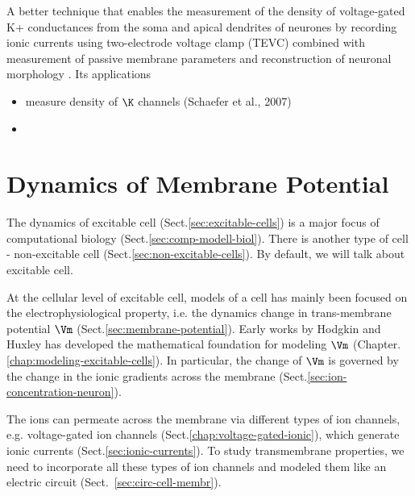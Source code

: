 A better technique that enables the measurement of the density of voltage-gated
K+ conductances from the soma and apical dendrites of neurones by recording
ionic currents using two-electrode voltage clamp (TEVC) combined with
measurement of passive membrane parameters and reconstruction of neuronal
morphology \citep{schaefer2003}. Its applications
\begin{itemize}
  \item measure density of $\K$ channels (Schaefer et al., 2007)

  \item
\end{itemize}

\chapter{Dynamics of Membrane Potential}
\label{chap:dynamics-Vm}

\def\Erev{{\text{E}_{\text{rev}}}}
  \def\deact{{\text{deact}}}

The dynamics of excitable cell (Sect.\ref{sec:excitable-cells}) is a major focus
of computational biology (Sect.\ref{sec:comp-modell-biol}).
There is another type of cell - non-excitable cell
(Sect.\ref{sec:non-excitable-cells}).
By default, we will talk about excitable cell.

At the cellular level of excitable cell, models of a cell has mainly been
focused on the electrophysiological property, i.e. the dynamics change in
trans-membrane potential $\Vm$ (Sect.\ref{sec:membrane-potential}).
Early works by Hodgkin and Huxley has developed the mathematical foundation for
modeling $\Vm$ (Chapter.\ref{chap:modeling-excitable-cells}). In particular, the
change of $\Vm$ is governed by the change in the ionic gradients across the
membrane (Sect.\ref{sec:ion-concentration-neuron}).

The ions can permeate across the membrane via different types of ion channels,
e.g. voltage-gated ion channels (Sect.\ref{chap:voltage-gated-ionic}), which
generate ionic currents (Sect.\ref{sec:ionic-currents}).
To study transmembrane properties, we need to incorporate all these types of ion
channels and modeled them like an electric circuit
(Sect.~\ref{sec:circ-cell-membr}).


